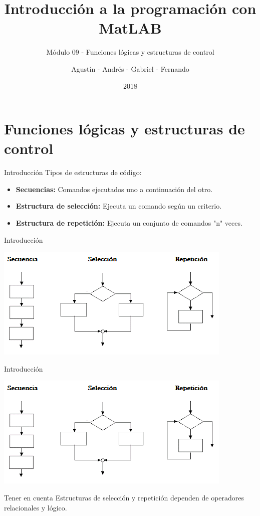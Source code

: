 \documentclass{bredelebeamer}
\title[Programación en MatLAB]{Introducción a la programación con MatLAB}
\subtitle{Módulo 09 - Funciones lógicas y estructuras de control}
\author{Agustín - Andrés - Gabriel - Fernando\inst{1}}
\institute[UTN.BA]
{
  \inst{1}%
  Universidad Tecnológica Nacional\\
  Facultad Regional Buenos Aires
  }
\date{2018}
\begin{document}
\begin{frame}
  \titlepage 
\end{frame}



\section{Funciones lógicas y estructuras de control}

\begin{frame}{Introducción}
Tipos de estructuras de código:
\begin{itemize}
\item \textbf{Secuencias:} Comandos ejecutados uno a continuación del otro.
\item \textbf{Estructura de selección:} Ejecuta un comando según un criterio.
\item \textbf{Estructura de repetición:} Ejecuta un conjunto de comandos "n" veces.
\end{itemize}
\end{frame}

\begin{frame}{Introducción}
\begin{center}
\includegraphics[scale=0.7]{images/pantalla3.png}
\end{center}
\end{frame}

\begin{frame}{Introducción}
\begin{center}
\includegraphics[scale=0.7]{images/pantalla3.png}
\end{center}
\begin{block}{Tener en cuenta}
Estructuras de selección y repetición dependen de operadores relacionales y lógico.
\end{block}
\end{frame}
\end{document}
